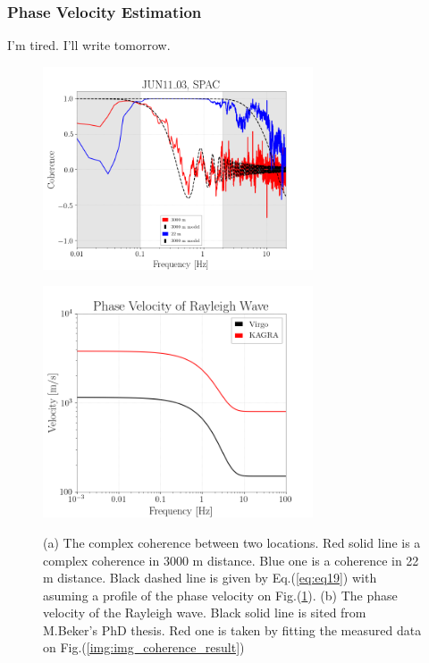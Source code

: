 \documentclass[a4paper,12pt]{book}
\begin{document}
\subsubsection{Phase Velocity Estimation}
I'm tired. I'll write tomorrow.
\begin{figure}[H] 
 \begin{minipage}{0.5\hsize}
  \begin{center}
    \includegraphics[width=8.0cm]{./img_coherence_result.png}    
  \end{center}
  \subcaption{}  
  \label{img:img_coherence_result}
 \end{minipage}
 \begin{minipage}{0.5\hsize}
  \begin{center}
    \includegraphics[width=8.0cm]{./img_RwaveVelocity.png}    
  \end{center}
  \subcaption{}
  \label{img:img_RwaveVelocity}  
 \end{minipage}
  \caption{(a) The complex coherence between two locations. Red solid line is a complex coherence in 3000 m distance. Blue one is a coherence in 22 m distance. Black dashed line is given by Eq.(\ref{eq:eq19}) with asuming a profile of the phase velocity on Fig.(\ref{img:img_RwaveVelocity}). (b) The phase velocity of the Rayleigh wave. Black solid line is sited from M.Beker's PhD thesis. Red one is taken by fitting the measured data on Fig.(\ref{img:img_coherence_result})} 
\end{figure}
\end{document}
